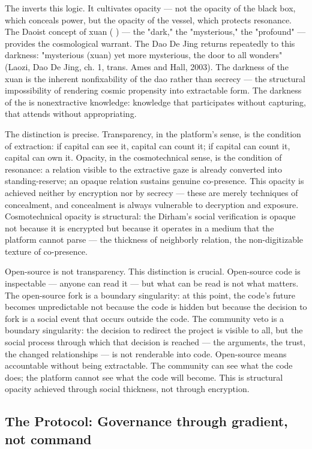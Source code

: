 The  inverts this logic. It cultivates opacity — not the opacity of the black box, which conceals power, but the opacity of the vessel, which protects resonance. The Daoist concept of xuan (  ) — the "dark," the "mysterious," the "profound" — provides the cosmological warrant. The Dao De Jing returns repeatedly to this darkness: "mysterious (xuan) yet more mysterious, the door to all wonders" (Laozi, Dao De Jing, ch. 1, trans. Ames and Hall, 2003). The darkness of the xuan is the inherent nonfixability of the dao rather than secrecy — the structural impossibility of rendering cosmic propensity into extractable form. The darkness of the  is nonextractive knowledge: knowledge that participates without capturing, that attends without appropriating.

The distinction is precise. Transparency, in the platform's sense, is the condition of extraction: if capital can see it, capital can count it; if capital can count it, capital can own it. Opacity, in the cosmotechnical sense, is the condition of resonance: a relation visible to the extractive gaze is already converted into standing-reserve; an opaque relation sustains genuine co-presence. This opacity is achieved neither by encryption nor by secrecy — these are merely techniques of concealment, and concealment is always vulnerable to decryption and exposure. Cosmotechnical opacity is structural: the Dirham's social verification is opaque not because it is encrypted but because it operates in a medium that the platform cannot parse — the thickness of neighborly relation, the non-digitizable texture of co-presence.

Open-source is not transparency. This distinction is crucial. Open-source code is inspectable — anyone can read it — but what can be read is not what matters. The open-source fork is a boundary singularity: at this point, the code's future becomes unpredictable not because the code is hidden but because the decision to fork is a social event that occurs outside the code. The community veto is a boundary singularity: the decision to redirect the project is visible to all, but the social process through which that decision is reached — the arguments, the trust, the changed relationships — is not renderable into code. Open-source means accountable without being extractable. The community can see what the code does; the platform cannot see what the code will become. This is structural opacity achieved through social thickness, not through encryption.

\subsection{The  Protocol: Governance through gradient, not command}

